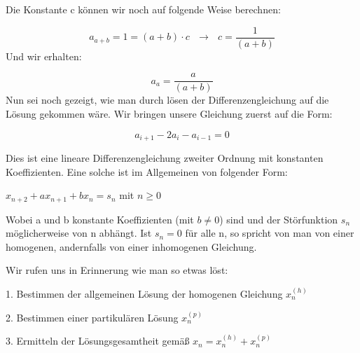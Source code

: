 \begin{uebsp}

{
Die Konstante c k\"onnen wir noch auf folgende Weise berechnen:}



\begin{equation*}
a_{a+b}=1=(a+b)\cdot c\text{   }\rightarrow \text{   }c=\frac{1}{(a+b)}
\end{equation*}
{
Und wir erhalten:}



\begin{equation*}
a_{a}=\frac{a}{(a+b)}
\end{equation*}
{
Nun sei noch gezeigt, wie man durch l\"osen der Differenzengleichung auf
die L\"osung gekommen w\"are. Wir bringen unsere Gleichung zuerst auf
die Form:}



\begin{equation*}
a_{i+1}-2a_{i}-a_{i-1}=0
\end{equation*}




{
Dies ist eine lineare Differenzengleichung zweiter Ordnung mit
konstanten Koeffizienten. Eine solche ist im Allgemeinen von folgender
Form:}



{
 $x_{n+2}+\mathit{ax}_{n+1}+\mathit{bx}_{n}=s_{n}$  mit  $n\geqslant 0$
}



{
Wobei a und b konstante Koeffizienten (mit  $b\neq 0$) sind und der
St\"orfunktion  $s_{n}$ m\"oglicherweise von n abh\"angt. Ist 
$s_{n}=0$ f\"ur alle n, so spricht von man von einer homogenen,
andernfalls von einer inhomogenen Gleichung.}



{
Wir rufen uns in Erinnerung wie man so etwas l\"ost:}



{
1. Bestimmen der allgemeinen L\"osung der homogenen Gleichung 
$x_{n}^{(h)}$ }

{
2. Bestimmen einer partikul\"aren L\"osung  $x_{n}^{(p)}$ }

{
3. Ermitteln der L\"osungsgesamtheit gem\"a{\ss} 
$x_{n}=x_{n}^{(h)}+x_{n}^{(p)}$ }



\end{uebsp}

